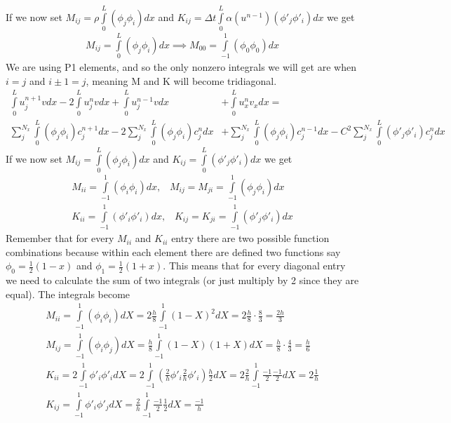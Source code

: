 \documentclass[a4paper,english, 10pt, twoside]{article}
\begin{document}
If we now set $M_{ij} = \rho\int\limits_0^L(\phi_j\phi_i)dx$ and $K_{ij} = \Delta t\int\limits_0^L\alpha(u^{n-1})(\phi'_j\phi'_i)dx $ we get
\begin{align*}
M_{ij} = \int\limits_0^L(\phi_j\phi_i)dx \implies M_{00} = \int\limits_{-1}^1(\phi_0\phi_0)dx
\end{align*}
We are using P1 elements, and so the only nonzero integrals we will get are when $i=j$ and $i\pm1 = j$, meaning M and K will become tridiagonal.\\
\begin{align*}
 \int\limits_0^Lu_j^{n+1}vdx -2\int\limits_0^Lu_j^nvdx + \int\limits_0^Lu_j^{n-1}vdx &+ \int\limits_0^Lu_x^nv_xdx    = \\
\sum\limits_j^{N_x}\int\limits_0^L(\phi_j\phi_i)c_j^{n+1}dx - 2\sum\limits_j^{N_x}\int\limits_0^L(\phi_j\phi_i)c_j^{n}dx &+ 
  \sum\limits_j^{N_x}\int\limits_0^L(\phi_j\phi_i)c_j^{n-1}dx - C^2\sum\limits_j^{N_x}\int\limits_0^L(\phi'_j\phi'_i)c_j^{n}dx
\end{align*}
If we now set $M_{ij} = \int\limits_0^L(\phi_j\phi_i)dx$ and $K_{ij} = \int\limits_0^L(\phi'_j\phi'_i)dx $ we get
\begin{align*}
M_{ii} =  \int\limits_{-1}^1(\phi_i\phi_i)dx, \;\;\;
M_{ij} = M_{ji} = \int\limits_{-1}^1(\phi_j\phi_i)dx \\
K_{ii} =  \int\limits_{-1}^1(\phi'_i\phi'_i)dx, \;\;\;
K_{ij} = K_{ji} = \int\limits_{-1}^1(\phi'_j\phi'_i)dx
\end{align*}
Remember that for every $M_{ii}$ and $K_{ii}$ entry there are two possible function combinations because within each element there 
are defined two functions say $\phi_0 = \frac{1}{2}(1-x)$ and $\phi_1 = \frac{1}{2}(1+x)$. This means that for every diagonal entry 
we need to calculate the sum of two integrals (or just multiply by 2 since they are equal). The integrals become
\begin{align*}
M_{ii} = \int\limits_{-1}^1(\phi_i\phi_i)dX = 2\frac{h}{8}\int\limits_{-1}^1(1-X)^2dX = 2\frac{h}{8}\cdot\frac{8}{3} = \frac{2h}{3}\\
M_{ij} = \int\limits_{-1}^1(\phi_i\phi_j)dX = \frac{h}{8}\int\limits_{-1}^1(1-X)(1+X)dX = \frac{h}{8}\cdot\frac{4}{3} = \frac{h}{6}\\
K_{ii} = 2\int\limits_{-1}^1\phi'_i\phi'_idX = 2\int\limits_{-1}^1(\frac{2}{h}\phi'_i\frac{2}{h}\phi'_i)\frac{h}{2}dX
 = 2\frac{2}{h}\int\limits_{-1}^1\frac{-1}{2}\frac{-1}{2}dX = 2\frac{1}{h}\\
K_{ij} = \int\limits_{-1}^1\phi'_i\phi'_jdX = \frac{2}{h}\int\limits_{-1}^1\frac{-1}{2}\frac{1}{2}dX = \frac{-1}{h}
\end{align*}
\end{document}
